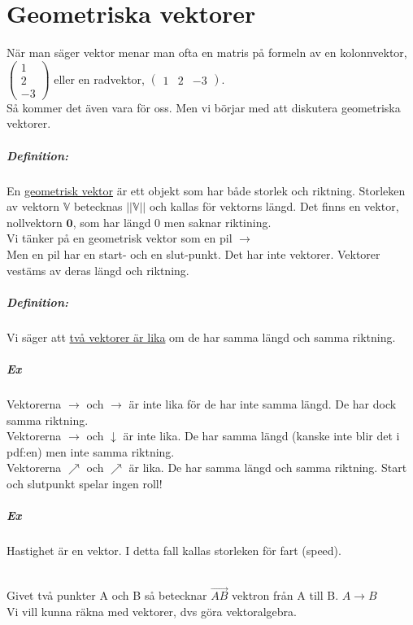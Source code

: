 \chapter{Geometriska vektorer}
När man säger vektor menar man ofta en matris på formeln av en kolonnvektor, $
    \begin{pmatrix}
        1 \\ 2\\ -3
    \end{pmatrix}
$ eller en radvektor, $\begin{pmatrix}1 & 2 & -3\end{pmatrix}$.
\\Så kommer det även vara för oss. Men vi börjar med att diskutera geometriska vektorer.

\paragraph{Definition:} En \underline{geometrisk vektor} är ett objekt som har både storlek och riktning.
Storleken av vektorn $\mathbb{V}$ betecknas $||\mathbb{V}||$ och kallas för vektorns längd.
Det finns en vektor, nollvektorn $\bm{0}$, som har längd 0 men saknar riktining.
~\\
Vi tänker på en geometrisk vektor som en pil $\longrightarrow$
\\Men en pil har en start- och en slut-punkt. Det har inte vektorer.
Vektorer vestäms av deras längd och riktning.

\paragraph{Definition:} Vi säger att \underline{två vektorer är lika} om de har samma längd och samma riktning.

\paragraph{Ex} Vektorerna $\longrightarrow$ och $\rightarrow $ är inte lika för de har inte samma längd.
De har dock samma riktning.\\
Vektorerna $\rightarrow  $ och $\downarrow $ är inte lika. De har samma längd (kanske inte blir det i pdf:en) men inte samma riktning.\\
Vektorerna $\nearrow $ och $\nearrow $ är lika. De har samma längd och samma riktning.
Start och slutpunkt spelar ingen roll!

\paragraph{Ex} Hastighet är en vektor. I detta fall kallas storleken för fart (speed).
\par
~\\
Givet två punkter A och B så betecknar $\overrightarrow{AB}$ vektron från A till B. $A\longrightarrow B$
\\Vi vill kunna räkna med vektorer, dvs göra vektoralgebra.

